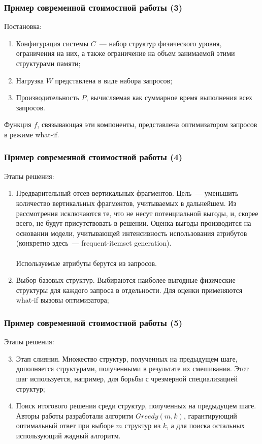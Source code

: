 \documentclass[unicode]{beamer}
\begin{document}
\begin{frame}
\frametitle{Пример современной стоимостной работы (3)}

Постановка:

\begin{enumerate}
  \setlength\itemsep{1em}	
  \item Конфигурация системы $C$~--- набор структур физического уровня, ограничения на них, а также ограничение на объем занимаемой этими структурами памяти;
  \item Нагрузка $W$ представлена в виде набора запросов;
  \item Производительность $P$, вычисляемая как суммарное время выполнения всех запросов.
\end{enumerate}
Функция $f$, связывающая эти компоненты, представлена оптимизатором запросов в режиме what-if.

\end{frame}

\begin{frame}
\frametitle{Пример современной стоимостной работы (4)}

Этапы решения:

\begin{enumerate}
  \item Предварительный отсев вертикальных фрагментов. Цель~--- уменьшить количество вертикальных фрагментов, учитываемых в дальнейшем. Из рассмотрения исключаются те, что не несут потенциальной выгоды, и, скорее всего, не будут присутствовать в решении. Оценка выгоды производится на основании модели, учитывающей интенсивность использования атрибутов (конкретно здесь~--- frequent-itemset generation).\\~\\
  
  Используемые атрибуты берутся из запросов.
  
  \item Выбор базовых структур. Выбираются наиболее выгодные физические структуры для каждого запроса в отдельности. Для оценки применяются what-if вызовы оптимизатора;
\end{enumerate}
\end{frame}

\begin{frame}
\frametitle{Пример современной стоимостной работы (5)}

Этапы решения:

\begin{enumerate}
  \setcounter{enumi}{2}

  \item Этап слияния. Множество структур, полученных на предыдущем шаге, дополняется структурами, полученными в результате их смешивания. Этот шаг используется, например, для борьбы с чрезмерной специализацией структур;
  \item Поиск итогового решения среди структур, полученных на предыдущем шаге. Авторы работы разработали алгоритм $Greedy (m, k)$, гарантирующий оптимальный ответ при выборе $m$ структур из $k$, а для поиска остальных использующий жадный алгоритм.
\end{enumerate}
\end{frame}
\end{document}
